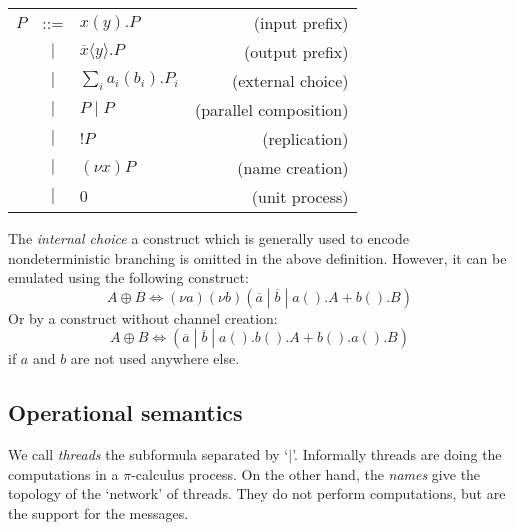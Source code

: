 \documentclass[a4paper]{report}
\numberwithin{algorithm}{chapter}
\begin{document}
\begin{tabular}{lclr}
$P$ & ::= & $x(y).P $                           & (input prefix)\\
    & $|$ & $\overline{x} \langle y \rangle.P $ & (output prefix)\\
    & $|$ & $ \sum_i a_i(b_i).P_i $             & (external choice) \\
    & $|$ & $P\;|\;P $                          & (parallel composition)\\
    & $|$ & $!P $                               & (replication) \\
    & $|$ & $(\nu x)P $                         & (name creation)\\
    & $|$ & $0 $                                & (unit process)
\end{tabular}

\begin{rem}
The \emph{internal choice} a construct which is generally used to encode nondeterministic branching is omitted in the above definition.
However, it can be emulated using the following construct:
\begin{equation*}
A \oplus B \Leftrightarrow (\nu a)(\nu b)(\overline{a} \;|\; \overline{b} \;|\; a().A + b().B )
\end{equation*}
Or by a construct without channel creation:
\begin{equation*}
A \oplus B \Leftrightarrow (\overline{a} \;|\; \overline{b} \;|\; a().b().A + b().a().B )
\end{equation*}
if $a$ and $b$ are not used anywhere else.
\end{rem}

\subsection{Operational semantics}

We call \emph{threads} the subformula separated by `$|$'.
Informally threads are doing the computations in a $\pi$-calculus process.%
On the other hand, the \emph{names} give the topology of the `network' of threads.
They do not perform computations, but are the support for the messages.
\end{document}
